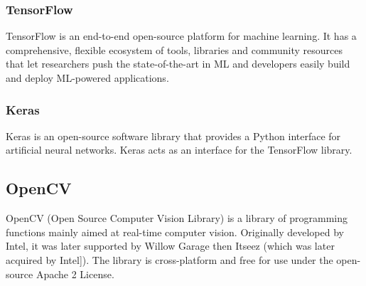     \subsubsection{TensorFlow}
    TensorFlow is an end-to-end open-source platform for machine learning. It has a comprehensive, flexible ecosystem of tools, 
    libraries and community resources that let researchers push the state-of-the-art in ML and developers easily build and deploy ML-powered applications.

    \subsubsection{Keras}
    Keras is an open-source software library that provides a Python interface for artificial neural networks. Keras acts as an interface for the TensorFlow library.
    
    \subsection{OpenCV}
    OpenCV (Open Source Computer Vision Library) is a library of programming functions mainly aimed at real-time computer vision. Originally developed by Intel, 
    it was later supported by Willow Garage then Itseez (which was later acquired by Intel]). The library is cross-platform and free for use under the open-source Apache 2 License. 